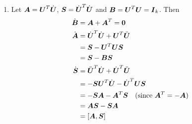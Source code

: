 \documentclass[11pt]{article}
\begin{document}
\begin{enumerate}
\item Let $\mb{A} = \mb{U}^{T}\dot{\mb{U}}$, $\mb{S} = \dot{\mb{U}}^{T}\dot{\mb{U}}$ and $\mb{B} = \mb{U}^{T}\mb{U}=\mb{I}_{k}$. Then 
\begin{align*}
\dot{\mb{B}} & = \mb{A} + \mb{A}^{T} = \mb{0}\\
\dot{\mb{A}} &= \dot{\mb{U}}^{T}\dot{\mb{U}}+  \mb{U}^{T}\ddot{\mb{U}}\\
&= \mb{S} - \mb{U}^{T}\mb{U}\mb{S} \\
&= \mb{S} - \mb{B}\mb{S} \\
\dot{\mb{S}} &= \ddot{\mb{U}}^{T}\dot{\mb{U}}+  \dot{\mb{U}}^{T}\ddot{\mb{U}}\\
&= -\mb{S}\mb{U}^{T}\dot{\mb{U}} - \dot{\mb{U}}^{T}\mb{U}\mb{S} \\
&= -\mb{SA} - \mb{A}^{T}\mb{S}\quad (\text{since } \mb{A}^{T} = -\mb{A} )\\
&= \mb{A}\mb{S}-\mb{SA} \\
& = \brac{\mb{A}, \mb{S}}
\end{align*}


\end{enumerate}
\end{document}
